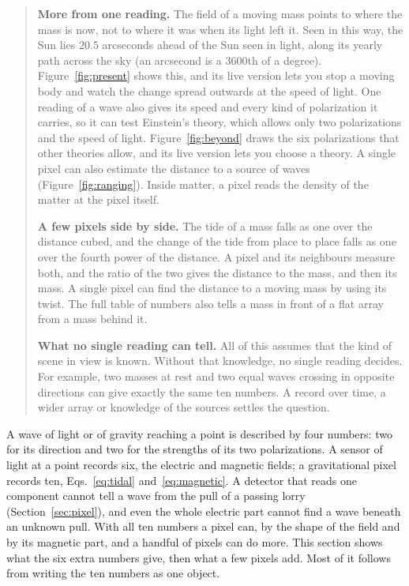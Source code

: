 \begin{quote}
\textbf{More from one reading.} The field of a moving mass points to where the
mass is now, not to where it was when its light left it. Seen in this way, the
Sun lies $20.5$ arcseconds ahead of the Sun seen in light, along its yearly path
across the sky (an arcsecond is a 3600th of a degree). Figure~\ref{fig:present} shows this, and its live version lets you stop a moving body and watch the change spread outwards at the speed of light. One reading of a wave
also gives its speed and every kind of polarization it carries, so it can test
Einstein's theory, which allows only two polarizations and the speed of light. Figure~\ref{fig:beyond} draws the six polarizations that other theories allow, and its live version lets you choose a theory. A single pixel can also estimate the distance to a source of waves (Figure~\ref{fig:ranging}).
Inside matter, a pixel reads the density of the matter at the pixel itself.

\textbf{A few pixels side by side.} The tide of a mass falls as one over the
distance cubed, and the change of the tide from place to place falls as one
over the fourth power of the distance. A pixel and its neighbours measure both,
and the ratio of the two gives the distance to the mass, and then its mass. A
single pixel can find the distance to a moving mass by using its twist. The full
table of numbers also tells a mass in front of a flat array from a mass behind
it.

\textbf{What no single reading can tell.} All of this assumes that the kind of
scene in view is known. Without that knowledge, no single reading decides. For
example, two masses at rest and two equal waves crossing in opposite directions
can give exactly the same ten numbers. A record over time, a wider array or
knowledge of the sources settles the question.
\end{quote}

A wave of light or of gravity reaching a point is described by four numbers: two
for its direction and two for the strengths of its two polarizations. A sensor
of light at a point records six, the electric and magnetic fields; a
gravitational pixel records ten, Eqs.~\eqref{eq:tidal} and~\eqref{eq:magnetic}.
A detector that reads one
component cannot tell a wave from the pull of a passing lorry
(Section~\ref{sec:pixel}), and even the
whole electric part cannot find a wave beneath an unknown pull. With
all ten numbers a pixel can, by the shape of the field and by its magnetic
part, and a handful of pixels can do more. This section shows what the six extra numbers
give, then what a few pixels add. Most of it follows from writing the ten
numbers as one object.

